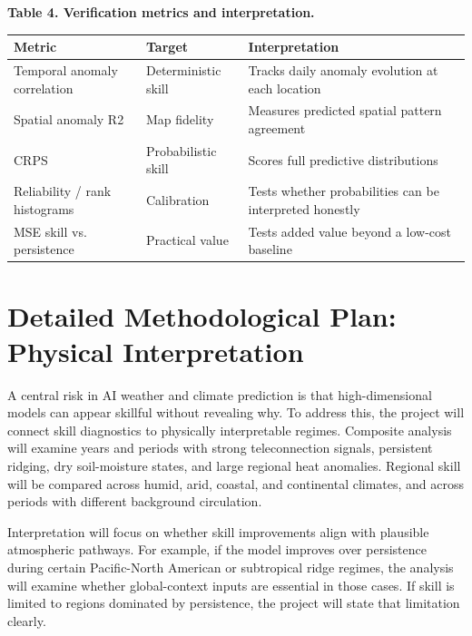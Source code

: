 \documentclass[11pt,letterpaper]{article}
\begin{document}
\begin{center}\scriptsize
\textbf{Table 4. Verification metrics and interpretation.}\\[0.03in]
\begin{tabularx}{\textwidth}{p{}p{}X}
\toprule
\textbf{Metric} & \textbf{Target} & \textbf{Interpretation}\\
\midrule
Temporal anomaly correlation & Deterministic skill & Tracks daily anomaly evolution at each location\\
Spatial anomaly R2 & Map fidelity & Measures predicted spatial pattern agreement\\
CRPS & Probabilistic skill & Scores full predictive distributions\\
Reliability / rank histograms & Calibration & Tests whether probabilities can be interpreted honestly\\
MSE skill vs. persistence & Practical value & Tests added value beyond a low-cost baseline\\
\bottomrule
\end{tabularx}
\end{center}

\newpage
\section*{Detailed Methodological Plan: Physical Interpretation}
A central risk in AI weather and climate prediction is that high-dimensional models can appear skillful without revealing why. To address this, the project will connect skill diagnostics to physically interpretable regimes. Composite analysis will examine years and periods with strong teleconnection signals, persistent ridging, dry soil-moisture states, and large regional heat anomalies. Regional skill will be compared across humid, arid, coastal, and continental climates, and across periods with different background circulation.

Interpretation will focus on whether skill improvements align with plausible atmospheric pathways. For example, if the model improves over persistence during certain Pacific-North American or subtropical ridge regimes, the analysis will examine whether global-context inputs are essential in those cases. If skill is limited to regions dominated by persistence, the project will state that limitation clearly.
\end{document}
